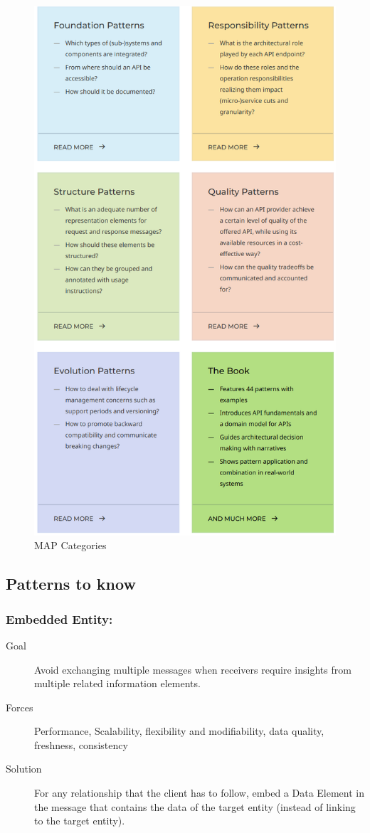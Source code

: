 \documentclass[../Main.tex]{subfiles}
\begin{document}
\begin{figure}[H]
    \centering
    \includegraphics[width=0.6\linewidth]{Images/map-categories.png}
    \caption{MAP Categories}
\end{figure}

\subsection{Patterns to know}
\subsubsection{Embedded Entity:}
\begin{description}
    \item[Goal] Avoid exchanging multiple messages when receivers require insights from multiple related information elements.
    \item[Forces] Performance, Scalability, flexibility and modifiability, data quality, freshness, consistency
    \item[Solution] For any relationship that the client has to follow, embed a Data Element in the message that contains
    the data of the target entity (instead of linking to the target entity).
\end{description}
\end{document}
